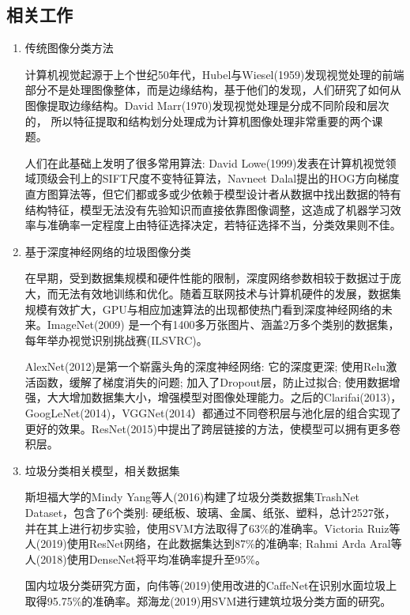 \documentclass[a4paper]{article}
\begin{document}
\begin{CJK*}{UTF8}{gbsn}
\section{相关工作}
\begin{enumerate}
\item 传统图像分类方法

计算机视觉起源于上个世纪50年代，Hubel与Wiesel(1959)发现视觉处理的前端部分不是处理图像整体，而是边缘结构，基于他们的发现，人们研究了如何从图像提取边缘结构。David Marr(1970)发现视觉处理是分成不同阶段和层次的，
所以特征提取和结构划分处理成为计算机图像处理非常重要的两个课题。

人们在此基础上发明了很多常用算法: David Lowe(1999)发表在计算机视觉领域顶级会刊上的SIFT尺度不变特征算法\cite{790410}，Navneet Dalal提出的HOG方向梯度直方图算法\cite{dalal2005histograms}等，但它们都或多或少依赖于模型设计者从数据中找出数据的特有结构特征，模型无法没有先验知识而直接依靠图像调整，这造成了机器学习效率与准确率一定程度上由特征选择决定，若特征选择不当，分类效果则不佳。

\item 基于深度神经网络的垃圾图像分类

在早期，受到数据集规模和硬件性能的限制，深度网络参数相较于数据过于庞大，而无法有效地训练和优化。随着互联网技术与计算机硬件的发展，数据集规模有效扩大，GPU与相应加速算法的出现都使热门看到深度神经网络的未来。ImageNet(2009) 是一个有1400多万张图片、涵盖2万多个类别的数据集，每年举办视觉识别挑战赛(ILSVRC)。

AlexNet(2012)是第一个崭露头角的深度神经网络: 它的深度更深; 使用Relu激活函数，缓解了梯度消失的问题; 加入了Dropout层，防止过拟合; 使用数据增强，大大增加数据集大小，增强模型对图像处理能力。之后的Clarifai(2013)，GoogLeNet(2014)，VGGNet(2014）都通过不同卷积层与池化层的组合实现了更好的效果。ResNet(2015)中提出了跨层链接的方法，使模型可以拥有更多卷积层。

\item 垃圾分类相关模型，相关数据集

斯坦福大学的Mindy Yang等人(2016)构建了垃圾分类数据集TrashNet Dataset，包含了6个类别: 硬纸板、玻璃、金属、纸张、塑料，总计2527张，并在其上进行初步实验，使用SVM方法\cite{yang2016classification}取得了63\%的准确率。Victoria Ruiz等人(2019)使用ResNet网络，在此数据集达到87\%的准确率; Rahmi Arda Aral等人(2018)使用DenseNet将平均准确率提升至95\%。

国内垃圾分类研究方面，向伟等(2019)使用改进的CaffeNet在识别水面垃圾上取得95.75\%的准确率。郑海龙(2019)用SVM进行建筑垃圾分类方面的研究。


\end{enumerate}
\end{CJK*}
\end{document}
